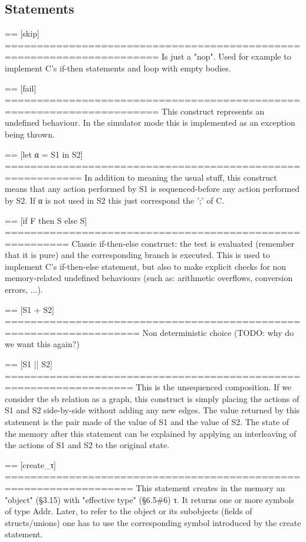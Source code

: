 \documentclass[12pt, a4paper]{article}
\newcommand{\TODO}[1]{{\color{red} #1}}
\begin{document}
\subsection{Statements}
\ottgrammartabular{
  \ottp\ottinterrule
  \ottcoreXXs\ottinterrule
  \ottfunXXdef\ottinterrule
  \ottprocXXdef\ottinterrule
  \ottprogram\ottafterlastrule
}


\TODO{
== [skip] ======================================================================
Is just a "nop". Used for example to implement C's if-then statements and loop
with empty bodies.

== [fail] ======================================================================
This construct represents an undefined behaviour. In the simulator mode this is
implemented as an exception being thrown.

== [let α = S1 in S2] ==========================================================
In addition to meaning the usual stuff, this construct means that any action
performed by S1 is sequenced-before any action performed by S2. If α is not used
in S2 this just correspond the ';' of C.

== [if F then S else S] ========================================================
Classic if-then-else construct: the test is evaluated (remember that it is pure)
and the corresponding branch is executed. This is used to implement C's
if-then-else statement, but also to make explicit checks for non memory-related
undefined behaviours (such as: arithmetic overflows, conversion errors, ...).

== [S1 + S2] ===================================================================
Non deterministic choice (TODO: why do we want this again?)


== [S1 || S2] ==================================================================
This is the unsequenced composition. If we consider the sb relation as a graph,
this construct is simply placing the actions of S1 and S2 side-by-side without
adding any new edges. The value returned by this statement is the pair made of
the value of S1 and the value of S2. The state of the memory after this
statement can be explained by applying an interleaving of the actions of S1 and
S2 to the original state.

== [create\_τ] ==================================================================
This statement creates in the memory an "object" (§3.15) with
"effective type" (§6.5\#6) τ. It returns one or more symbols of type Addr. Later,
to refer to the object or its subobjects (fields of structs/unions) one has to
use the corresponding symbol introduced by the create statement. 

}
\end{document}
